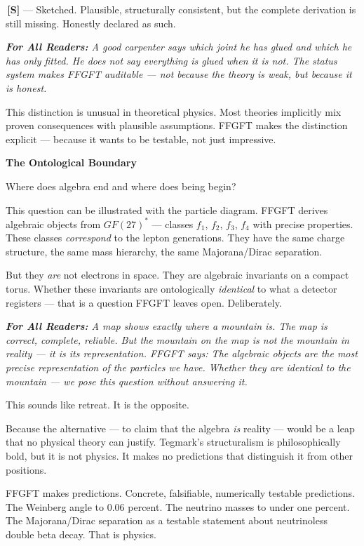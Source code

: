 \documentclass[11pt,oneside]{book}
\newcommand{\status}[1]{\penalty10000\,{\scriptsize\textcolor{gray!60}{[#1]}}}
\newenvironment{laierspur}{%
  \par\vspace{4pt}%
  \noindent\small\itshape\color{blue!60!black}%
  \textbf{For All Readers:}\enspace\ignorespaces}{%
  \par\vspace{4pt}\normalsize\normalfont\normalcolor}
\begin{document}
\textbf{\status{S}} — Sketched. Plausible, structurally consistent, but the complete
derivation is still missing. Honestly declared as such.

\begin{laierspur}
A good carpenter says which joint he has glued and which he has only
fitted. He does not say everything is glued when it is not. The status
system makes FFGFT auditable — not because the theory is weak, but because
it is honest.
\end{laierspur}

This distinction is unusual in theoretical physics. Most theories implicitly
mix proven consequences with plausible assumptions. FFGFT makes the
distinction explicit — because it wants to be testable, not just impressive.

\textbf{The Ontological Boundary}

Where does algebra end and where does being begin?

This question can be illustrated with the particle diagram. FFGFT derives
algebraic objects from $GF(27)^*$ — classes {$f_1$, $f_2$, $f_3$, $f_4$} with precise
properties. These classes \textit{correspond} to the lepton generations. They have
the same charge structure, the same mass hierarchy, the same Majorana/Dirac
separation.

But they \textit{are} not electrons in space. They are algebraic invariants on a
compact torus. Whether these invariants are ontologically \textit{identical} to
what a detector registers — that is a question FFGFT leaves open. Deliberately.

\begin{laierspur}
A map shows exactly where a mountain is. The map is correct, complete,
reliable. But the mountain on the map is not the mountain in reality — it is
its representation. FFGFT says: The algebraic objects are the most precise
representation of the particles we have. Whether they are identical to the
mountain — we pose this question without answering it.
\end{laierspur}

This sounds like retreat. It is the opposite.

Because the alternative — to claim that the algebra \textit{is} reality —
would be a leap that no physical theory can justify. Tegmark's structuralism
is philosophically bold, but it is not physics. It makes no predictions that
distinguish it from other positions.

FFGFT makes predictions. Concrete, falsifiable, numerically testable
predictions. The Weinberg angle to 0.06 percent. The neutrino masses to
under one percent. The Majorana/Dirac separation as a testable statement
about neutrinoless double beta decay. That is physics.
\end{document}
